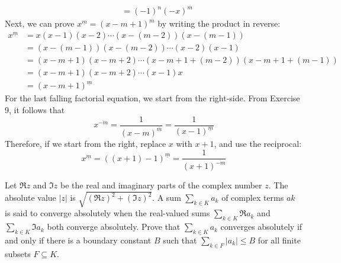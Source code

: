 \documentclass[12pt]{article}
\newenvironment{ex}[2][Exercise]{\begin{trivlist}
		\item[\hskip \labelsep {\bfseries #1}\hskip \labelsep {\bfseries #2.}]}{\end{trivlist}}
\newenvironment{sol}[1][Solution]{\begin{trivlist}
		\item[\hskip \labelsep {\bfseries #1:}]}{\end{trivlist}}
\begin{document}
\begin{sol}
\begin{align*}
		&=(-1)^n(-x)^{\overline{m}}
	\end{align*}
	Next, we can prove $x^{\underline{m}}=(x-m+1)^{\overline{m}}$ by writing the product
	in reverse:
	\begin{align*}
		x^{\underline{m}}&=x(x-1)(x-2)\cdots (x-(m-2))(x-(m-1))\\
		&=(x-(m-1))(x-(m-2))\cdots (x-2)(x-1)\\
		&=(x-m+1)(x-m+2)\cdots (x-m+1 +(m-2))(x-m+1+(m-1))\\
		&=(x-m+1)(x-m+2)\cdots (x-1)x\\
		&=(x-m+1)^{\underline{m}}
	\end{align*}
	For the last falling factorial equation, we start from the right-side. From Exercise 9,
	it follows that
	\[x^{\overline{-m}}=\frac{1}{(x-m)^{\overline{m}}}=\frac{1}{(x-1)^{\underline{m}}}\]
	Therefore, if we start from the right, replace $x$ with $x+1$, and use the reciprocal:
	\[
	x^{\underline{m}}=((x+1)-1)^{\underline{m}}=\frac{1}{(x+1)^{\overline{-m}}}
	\]
\end{sol}

\begin{ex}{18}
	Let $\Re z$ and $\Im z$ be the real and imaginary parts of the complex number $z$.
	The absolute value $|z|$ is $\sqrt{(\Re z)^2+(\Im z)^2}$. A sum $\sum_{k\in K} a_k$
	of complex terms $ak$ is said to converge absolutely when the real-valued sums
	$\sum_{k\in K}\Re a_k$ and $\sum_{k\in K} \Im a_k$ both converge absolutely.
	Prove that $\sum_{k\in K} a_k$ converges absolutely if and only if there is a
	boundary constant $B$ such that $\sum_{k\in F}|a_k|\leq B$ for all finite subsets
	$F \subseteq K$.
\end{ex}
\end{document}
